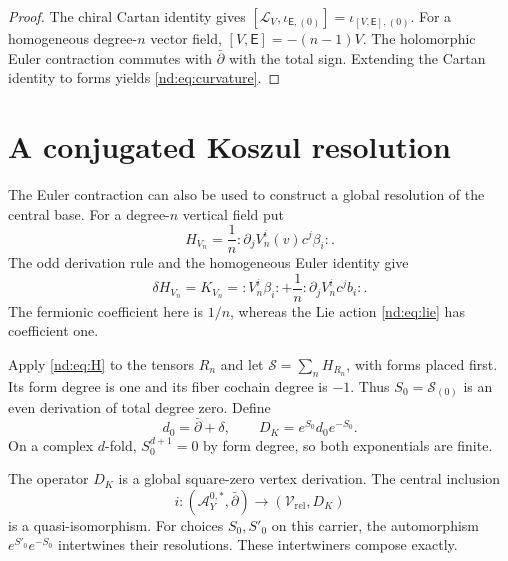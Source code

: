 \begin{proof}
The chiral Cartan identity gives
$[\mathcal L_V,\iota_{\mathsf E,(0)}]
=\iota_{[V,\mathsf E],(0)}$.
For a homogeneous degree-$n$ vector field,
$[V,\mathsf E]=-(n-1)V$.
The holomorphic Euler contraction commutes with $\bar\partial$
with the total sign. Extending the Cartan identity to forms yields
\eqref{nd:eq:curvature}.
\end{proof}

\section{A conjugated Koszul resolution}
\label{nd:sec:koszul}

The Euler contraction can also be used to construct a global
resolution of the central base. For a degree-$n$ vertical field put
\begin{equation}\label{nd:eq:H}
 H_{V_n}=\frac1n:\partial_jV_n^i(v)c^j\beta_i:.
\end{equation}
The odd derivation rule and the homogeneous Euler identity give
\begin{equation}\label{nd:eq:K}
 \delta H_{V_n}=K_{V_n}
  =:V_n^i\beta_i:
       +\frac1n:\partial_jV_n^ic^jb_i:.
\end{equation}
The fermionic coefficient here is $1/n$, whereas the Lie action
\eqref{nd:eq:lie} has coefficient one.

Apply \eqref{nd:eq:H} to the tensors $R_n$ and let
$\mathscr S=\sum_n H_{R_n}$, with forms placed first. Its form degree
is one and its fiber cochain degree is $-1$.
Thus $S_0=\mathscr S_{(0)}$ is an even derivation of total degree zero.
Define
\begin{equation}\label{nd:eq:DK}
 d_0=\bar\partial+\delta,\qquad
 D_K=e^{S_0}d_0e^{-S_0}.
\end{equation}
On a complex $d$-fold, $S_0^{d+1}=0$ by form degree, so both
exponentials are finite.

\begin{theorem}\label{nd:thm:koszul}
The operator $D_K$ is a global square-zero vertex derivation.
The central inclusion
\[
 i:(\mathcal A_Y^{0,*},\bar\partial)
        \longrightarrow(\mathcal V_{\mathrm{rel}},D_K)
\]
is a quasi-isomorphism. For choices $S_0,S'_0$ on this carrier,
the automorphism $e^{S'_0}e^{-S_0}$ intertwines their resolutions.
These intertwiners compose exactly.
\end{theorem}

